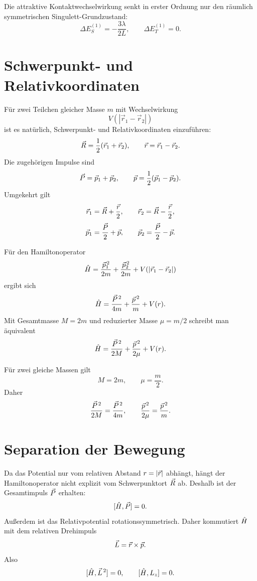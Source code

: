 \begin{answerbox}
Die attraktive Kontaktwechselwirkung senkt in erster Ordnung nur den räumlich symmetrischen Singulett-Grundzustand:
\[
    \Delta E_S^{(1)}=-\frac{3\lambda}{2L},
    \qquad
    \Delta E_T^{(1)}=0.
\]
\end{answerbox}

\section{Schwerpunkt- und Relativkoordinaten}

Für zwei Teilchen gleicher Masse \(m\) mit Wechselwirkung
\[
    V(|\vec r_1-\vec r_2|)
\]
ist es natürlich, Schwerpunkt- und Relativkoordinaten einzuführen:
\[
    \vec R = \frac{1}{2}(\vec r_1+\vec r_2),
    \qquad
    \vec r=\vec r_1-\vec r_2.
\]
Die zugehörigen Impulse sind
\[
    \vec P=\vec p_1+\vec p_2,
    \qquad
    \vec p=\frac{1}{2}(\vec p_1-\vec p_2).
\]
Umgekehrt gilt
\[
    \vec r_1=\vec R+\frac{\vec r}{2},
    \qquad
    \vec r_2=\vec R-\frac{\vec r}{2},
\]
\[
    \vec p_1=\frac{\vec P}{2}+\vec p,
    \qquad
    \vec p_2=\frac{\vec P}{2}-\vec p.
\]

Für den Hamiltonoperator
\[
    \hat H=\frac{\vec p_1^{\,2}}{2m}+\frac{\vec p_2^{\,2}}{2m}+V(|\vec r_1-\vec r_2|)
\]
ergibt sich
\[
    \hat H=\frac{\vec P^{\,2}}{4m}+\frac{\vec p^{\,2}}{m}+V(r).
\]
Mit Gesamtmasse \(M=2m\) und reduzierter Masse \(\mu=m/2\) schreibt man äquivalent
\[
    \hat H=\frac{\vec P^{\,2}}{2M}+\frac{\vec p^{\,2}}{2\mu}+V(r).
\]

\begin{formulabox}
Für zwei gleiche Massen gilt
\[
    M=2m,
    \qquad
    \mu=\frac{m}{2}.
\]
Daher
\[
    \frac{\vec P^{\,2}}{2M}=\frac{\vec P^{\,2}}{4m},
    \qquad
    \frac{\vec p^{\,2}}{2\mu}=\frac{\vec p^{\,2}}{m}.
\]
\end{formulabox}

\section{Separation der Bewegung}

Da das Potential nur vom relativen Abstand \(r=|\vec r|\) abhängt, hängt der Hamiltonoperator nicht explizit vom Schwerpunktort \(\vec R\) ab. Deshalb ist der Gesamtimpuls \(\vec P\) erhalten:
\[
    [\hat H,\vec P]=0.
\]
Außerdem ist das Relativpotential rotationssymmetrisch. Daher kommutiert \(\hat H\) mit dem relativen Drehimpuls
\[
    \vec L=\vec r\times\vec p.
\]
Also
\[
    [\hat H,\vec L^{\,2}]=0,
    \qquad
    [\hat H,L_z]=0.
\]

